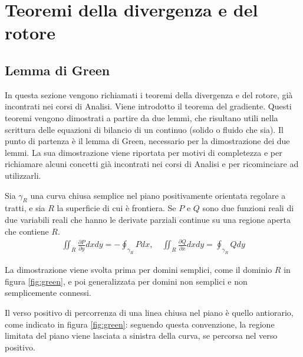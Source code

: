 \section{Teoremi della divergenza e del rotore}
\subsection{Lemma di Green}
In questa sezione vengono richiamati i teoremi della divergenza e del rotore, già incontrati nei corsi di Analisi. Viene introdotto il teorema del gradiente. Questi teoremi vengono dimostrati a partire da due lemmi, che risultano utili nella scrittura delle equazioni di bilancio di un continuo (solido o fluido che sia). Il punto di partenza è il lemma di Green, necessario per la dimostrazione dei due lemmi. La sua dimostrazione viene riportata per motivi di completezza e per richiamare alcuni concetti già incontrati nei corsi di Analisi e per ricominciare ad utilizzarli.

\begin{theorem}\label{thm:green}
Sia $\gamma_R$ una curva chiusa semplice nel piano positivamente orientata regolare a tratti, e sia $R$ la superficie di cui è frontiera. Se $P$ e $Q$ sono due funzioni reali di due variabili reali che hanno le derivate parziali continue su una regione aperta che contiene $R$.
\begin{equation}\label{eqn:green_thm} 
\begin{aligned}
 \iint_R \frac{\partial P}{\partial y} dx dy  = 
   - \oint_{\gamma_R} P dx,  \quad
  \iint_R \frac{\partial Q}{\partial x} dx dy = 
    \oint_{\gamma_R} Q dy
\end{aligned}
\end{equation}
\end{theorem}
%
La dimostrazione viene svolta prima per domini semplici, come il dominio $R$ in figura \ref{fig:green}, e poi generalizzata per domini non semplici e non semplicemente connessi.
\begin{remark}
 Il verso positivo di percorrenza di una linea chiusa nel piano è quello antiorario, come indicato in figura \ref{fig:green}: seguendo questa convenzione, la regione limitata del piano viene lasciata a sinistra della curva, se percorsa nel verso positivo.
\end{remark}

